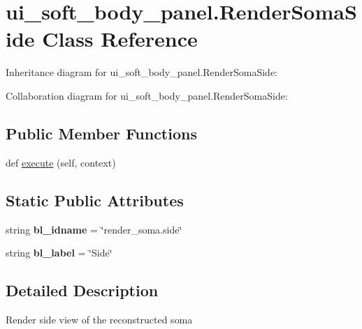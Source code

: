 \hypertarget{classui__soft__body__panel_1_1RenderSomaSide}{}\section{ui\+\_\+soft\+\_\+body\+\_\+panel.\+Render\+Soma\+Side Class Reference}
\label{classui__soft__body__panel_1_1RenderSomaSide}


Inheritance diagram for ui\+\_\+soft\+\_\+body\+\_\+panel.\+Render\+Soma\+Side\+:


Collaboration diagram for ui\+\_\+soft\+\_\+body\+\_\+panel.\+Render\+Soma\+Side\+:
\subsection*{Public Member Functions}
\begin{DoxyCompactItemize}
\item 
def \hyperlink{classui__soft__body__panel_1_1RenderSomaSide_aa1d772a38f48e51495f9d1a5349ec258}{execute} (self, context)
\end{DoxyCompactItemize}
\subsection*{Static Public Attributes}
\begin{DoxyCompactItemize}
\item 
string {\bfseries bl\+\_\+idname} = \char`\"{}render\+\_\+soma.\+side\char`\"{}\hypertarget{classui__soft__body__panel_1_1RenderSomaSide_ae821cf3501cc704eab76b6174e21040c}{}\label{classui__soft__body__panel_1_1RenderSomaSide_ae821cf3501cc704eab76b6174e21040c}

\item 
string {\bfseries bl\+\_\+label} = \char`\"{}Side\char`\"{}\hypertarget{classui__soft__body__panel_1_1RenderSomaSide_a5de2b4b13d2b4e75458ac3d5a512be79}{}\label{classui__soft__body__panel_1_1RenderSomaSide_a5de2b4b13d2b4e75458ac3d5a512be79}

\end{DoxyCompactItemize}


\subsection{Detailed Description}
\begin{DoxyVerb}Render side view of the reconstructed soma\end{DoxyVerb}
 

